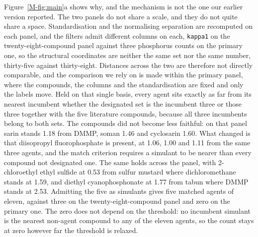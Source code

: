 \documentclass[11pt,a4paper]{article}
\begin{document}



Figure~\ref{M-fig:main}a shows why, and the mechanism is not
the one our earlier version reported. The two panels do not share a scale, and
they do not quite share a space. Standardisation and the normalising separation
are recomputed on each panel, and the filters admit different columns on
each, \texttt{kappa1} on the twenty-eight-compound panel against three
phosphorus counts on the primary one, so the structural coordinates are neither
the same set nor the same number, thirty-five against thirty-eight.
Distances across the two are therefore not directly comparable, and the
comparison we rely on is made within the primary panel, where the compounds,
the columns and the standardisation are fixed and only the labels move. Held on
that single basis, every agent sits exactly as far from its nearest incumbent
whether the designated set is the incumbent three or those three together with
the five literature compounds, because all three incumbents belong to both
sets. The compounds did not become less faithful: on that panel sarin stands
1.18 from DMMP, soman 1.46 and cyclosarin 1.60. What changed is that diisopropyl
fluorophosphate is present, at 1.06, 1.00 and 1.11 from the same three agents,
and the match criterion requires a simulant to be nearer than every compound not
designated one. The same holds across the panel, with 2-chloroethyl ethyl
sulfide at 0.53 from sulfur mustard where dichloromethane stands at 1.59, and
diethyl cyanophosphonate at 1.77 from tabun where DMMP stands at 2.53.
Admitting the five as simulants gives five matched agents of eleven, against
three on the twenty-eight-compound panel and zero on the primary one. The zero
does not depend on the threshold: no incumbent simulant is the
nearest non-agent compound to any of the eleven agents, so the count stays at
zero however far the threshold is relaxed.
\end{document}
